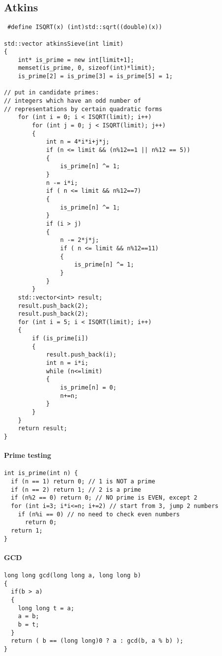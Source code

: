 \documentclass[a4paper,10pt,oneside]{report}
\begin{document}
\subsection{Atkins}
\begin{verbatim}
 #define ISQRT(x) (int)std::sqrt((double)(x))

std::vector atkinsSieve(int limit)
{
    int* is_prime = new int[limit+1];
    memset(is_prime, 0, sizeof(int)*limit);
    is_prime[2] = is_prime[3] = is_prime[5] = 1;

// put in candidate primes:
// integers which have an odd number of
// representations by certain quadratic forms
    for (int i = 0; i < ISQRT(limit); i++)
        for (int j = 0; j < ISQRT(limit); j++)
        {
            int n = 4*i*i+j*j;
            if (n <= limit && (n%12==1 || n%12 == 5))
            {
                is_prime[n] ^= 1;
            }
            n -= i*i;
            if ( n <= limit && n%12==7)
            {
                is_prime[n] ^= 1;
            }
            if (i > j)
            {
                n -= 2*j*j;
                if ( n <= limit && n%12==11)
                {
                    is_prime[n] ^= 1;
                }
            }
        }
    std::vector<int> result;
    result.push_back(2);
    result.push_back(2);
    for (int i = 5; i < ISQRT(limit); i++)
    {
        if (is_prime[i])
        {
            result.push_back(i);
            int n = i*i;
            while (n<=limit)
            {
                is_prime[n] = 0;
                n+=n;
            }
        }
    }
    return result;
}
\end{verbatim}

\paragraph{Prime testing}
\begin{verbatim}
int is_prime(int n) {
  if (n == 1) return 0; // 1 is NOT a prime
  if (n == 2) return 1; // 2 is a prime
  if (n%2 == 0) return 0; // NO prime is EVEN, except 2
  for (int i=3; i*i<=n; i+=2) // start from 3, jump 2 numbers
    if (n%i == 0) // no need to check even numbers
      return 0;
  return 1;
}
\end{verbatim}

\paragraph{GCD}
\begin{verbatim}
long long gcd(long long a, long long b) 
{
  if(b > a)
  {
    long long t = a;
    a = b;
    b = t;
  }
  return ( b == (long long)0 ? a : gcd(b, a % b) ); 
}
\end{verbatim}
\end{document}
